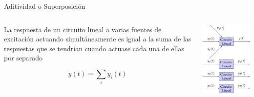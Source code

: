 \documentclass[xcolor={usenames,svgnames,dvipsnames}]{beamer}
\begin{document}
\begin{frame}[label={sec:orgab8f4c8}]{Aditividad o Superposición}
\begin{columns}
\begin{column}{0.5\columnwidth}
La respuesta de un \alert{circuito lineal} a varias fuentes de excitación actuando simultáneamente es igual a la suma de las respuestas que se tendrían cuando actuase cada una de ellas por separado

\[
y(t) = \sum_i y_i(t)
\]
\end{column}

\begin{column}{0.5\columnwidth}
\begin{center}
\includegraphics[width=.9\linewidth]{figs/superposicion.pdf}
\end{center}
\end{column}
\end{columns}
\end{frame}
\end{document}
